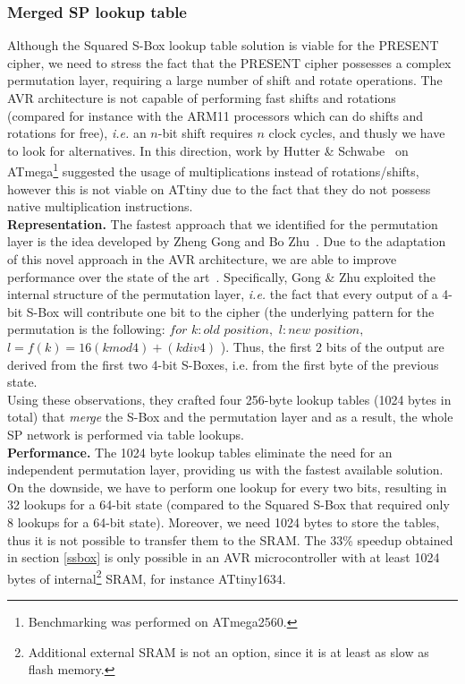 \documentclass[11pt]{article}
\begin{document}
\subsubsection{Merged SP lookup table}\label{msbox}
Although the Squared S-Box lookup table solution is viable for the PRESENT cipher, we need to stress the fact that the PRESENT cipher possesses a complex permutation layer, requiring a large number of shift and rotate operations. The AVR architecture is not capable of performing fast shifts and rotations (compared for instance with the ARM11 processors which can do shifts and rotations for free),  \emph{i.e.} an $n$-bit shift requires $n$ clock cycles, and thusly we have to look for alternatives.
In this direction, work by Hutter \& Schwabe~\cite{hutternacl} on ATmega\footnote{Benchmarking was performed on ATmega2560.} suggested the usage of multiplications instead of rotations/shifts, however this is not viable on ATtiny due to the fact that they do not possess native multiplication instructions.\\
\textbf{Representation.} The fastest approach that we identified for the permutation layer is the idea developed by Zheng Gong and Bo Zhu~\cite{gong_code,gong2009towards}. Due to the adaptation of this novel approach in the AVR architecture, we are able to improve performance over the state of the art~\cite{eisenbarth2012compact}. Specifically, Gong \& Zhu exploited the internal structure of the permutation layer, \emph{i.e.} the fact that every output of a 4-bit S-Box will contribute one bit to the cipher (the underlying pattern for the permutation is the following: $for$ $k:old$ $position,$ $l:new$ $position,$ $l=f(k)=16(k mod 4)+(k div 4)$ ). Thus, the first 2 bits of the output are derived from the first two 4-bit S-Boxes, i.e. from the first byte of the previous state. \\
Using these observations, they crafted four 256-byte lookup tables (1024 bytes in total) that \emph{merge} the S-Box and the permutation layer and as a result, the whole SP network is performed via table lookups.\\
\textbf{Performance.} The 1024 byte lookup tables eliminate the need for an independent permutation layer, providing us with the fastest available solution. On the downside, we have to perform one lookup for every two bits, resulting in 32 lookups for a 64-bit state (compared to the Squared S-Box that required only 8 lookups for a 64-bit state). Moreover, we need 1024 bytes to store the tables, thus it is not possible to transfer them to the SRAM. The 33\% speedup obtained in section \ref{ssbox} is only possible in an AVR microcontroller with at least 1024 bytes of internal\footnote{Additional external SRAM is not an option, since it is at least as slow as flash memory.} SRAM, for instance ATtiny1634.\\
\end{document}
